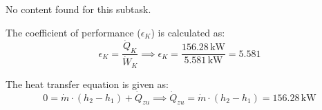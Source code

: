 No content found for this subtask.

The coefficient of performance (\( \epsilon_K \)) is calculated as:  
\[
\epsilon_K = \frac{\dot{Q}_K}{\dot{W}_K} \implies \epsilon_K = \frac{156.28 \, \text{kW}}{5.581 \, \text{kW}} = 5.581
\]  

The heat transfer equation is given as:  
\[
0 = \dot{m} \cdot (h_2 - h_1) + \dot{Q}_{zu} \implies \dot{Q}_{zu} = \dot{m} \cdot (h_2 - h_1) = 156.28 \, \text{kW}
\]
